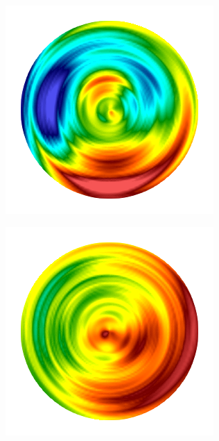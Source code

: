 \begin{figure}[htb!]
\begin{subfigure}{0.18\textwidth}
    \end{subfigure}
    \begin{subfigure}{0.19\textwidth}
        \includegraphics[width=\textwidth]{past/figures/Gc_ring.png}
    \end{subfigure}
    \begin{subfigure}{0.19\textwidth}
        \includegraphics[width=\textwidth]{past/figures/psic_ring.png}

\end{subfigure}
\end{figure}
